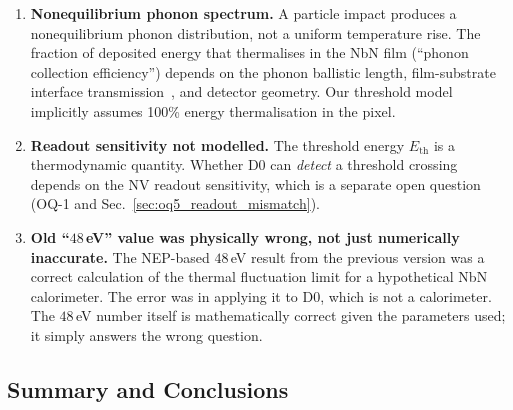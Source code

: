 \begin{enumerate}
\item \textbf{Nonequilibrium phonon spectrum.}
  A particle impact produces a nonequilibrium phonon distribution, not a
  uniform temperature rise. The fraction of deposited energy that
  thermalises in the NbN film (``phonon collection efficiency'') depends
  on the phonon ballistic length, film-substrate interface
  transmission~\cite{Sidorova2020}, %
  and detector geometry. Our threshold model implicitly assumes 100\%
  energy thermalisation in the pixel.

\item \textbf{Readout sensitivity not modelled.}
  The threshold energy $E_\mathrm{th}$ is a thermodynamic quantity. Whether
  D0 can \emph{detect} a threshold crossing depends on the NV readout
  sensitivity, which is a separate open question (OQ-1 and Sec.~\ref{sec:oq5_readout_mismatch}).

\item \textbf{Old ``$48$\,eV'' value was physically wrong, not just
  numerically inaccurate.}
  The NEP-based $48$\,eV result from the previous version was a
  correct calculation of the thermal fluctuation limit for a hypothetical
  NbN calorimeter. The error was in applying it to D0, which is not a
  calorimeter. The $48$\,eV number itself is mathematically correct
  given the parameters used; it simply answers the wrong question.

\end{enumerate}

\subsection{Summary and Conclusions}
\label{sec:oq5_conclusions}

